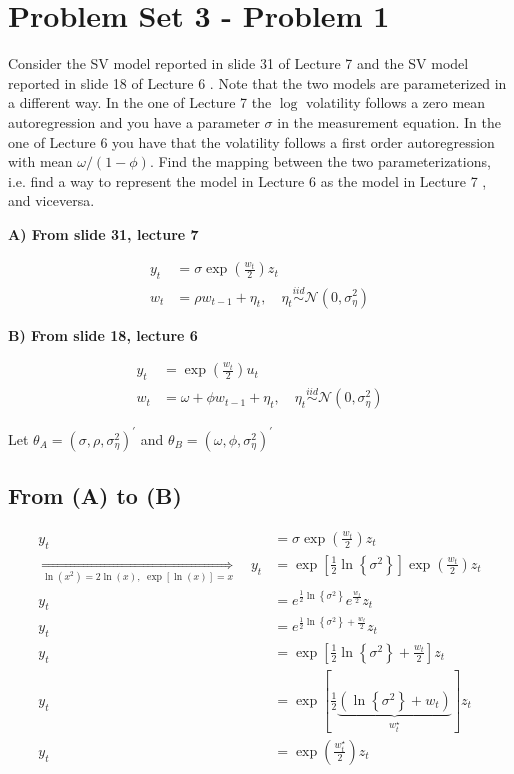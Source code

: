 \documentclass{article}
\begin{document}
\section{Problem Set 3 - Problem 1}

Consider the SV model reported in slide 31 of Lecture 7 and the SV
model reported in slide 18 of Lecture 6 . Note that the two models
are parameterized in a different way. In the one of Lecture 7 the
$\log$ volatility follows a zero mean autoregression and you have
a parameter $\sigma$ in the measurement equation. In the one of Lecture
6 you have that the volatility follows a first order autoregression
with mean $\omega/(1-\phi)$. Find the mapping between the two parameterizations,
i.e. find a way to represent the model in Lecture 6 as the model in
Lecture 7 , and viceversa.

\bigskip

\textbf{A) From slide 31, lecture 7}

\begin{align*}
y_{t} & =\sigma\exp\left(\frac{w_{t}}{2}\right)z_{t}\\
w_{t} & =\rho w_{t-1}+\eta_{t},\quad\eta_{t}\overset{iid}{\sim}\mathcal{N}\left(0,\sigma_{\eta}^{2}\right)
\end{align*}

\textbf{B) From slide 18, lecture 6 }

\begin{align*}
y_{t} & =\exp\left(\frac{w_{t}}{2}\right)u_{t}\\
w_{t} & =\omega+\phi w_{t-1}+\eta_{t},\quad\eta_{t}\overset{iid}{\sim}\mathcal{N}\left(0,\sigma_{\eta}^{2}\right)
\end{align*}

Let $\theta_{A}=\left(\sigma,\rho,\sigma_{\eta}^{2}\right)^{\prime}$
and $\theta_{B}=\left(\omega,\phi,\sigma_{\eta}^{2}\right)^{\prime}$


\subsection{From (A) to (B)}

\begin{align*}
y_{t} & =\sigma\exp\left(\frac{w_{t}}{2}\right)z_{t}\\
\underset{\ln\left(x^{2}\right)=2\ln\left(x\right),\;\exp\left[\ln\left(x\right)\right]=x}{\Longrightarrow}\quad y_{t} & =\exp\left[\frac{1}{2}\ln\left\{ \sigma^{2}\right\} \right]\exp\left(\frac{w_{t}}{2}\right)z_{t}\\
y_{t} & =e^{\frac{1}{2}\ln\left\{ \sigma^{2}\right\} }e^{\frac{w_{t}}{2}}z_{t}\\
y_{t} & =e^{\frac{1}{2}\ln\left\{ \sigma^{2}\right\} +\frac{w_{t}}{2}}z_{t}\\
y_{t} & =\exp\left[\frac{1}{2}\ln\left\{ \sigma^{2}\right\} +\frac{w_{t}}{2}\right]z_{t}\\
y_{t} & =\exp\left[\frac{1}{2}\underbrace{\left(\ln\left\{ \sigma^{2}\right\} +w_{t}\right)}_{w_{t}^{\star}}\right]z_{t}\\
y_{t} & =\exp\left(\frac{w_{t}^{\star}}{2}\right)z_{t}
\end{align*}
\end{document}
